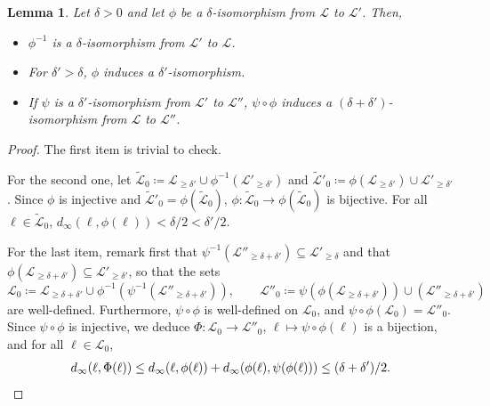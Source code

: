 \documentclass[11pt]{article}
\newtheorem{lemma}[theorem]{Lemma}
\begin{document}
\begin{lemma}
\label{le:tri}
  Let $\delta>0$ and let $\phi$ be a $\delta$-isomorphism from $\mathcal{L}$ to $\mathcal{L}'$. Then,
  \begin{itemize}
  \item $\phi^{-1}$ is a $\delta$-isomorphism from $\mathcal{L}'$ to $\mathcal{L}$.

  \item For  $\delta'>\delta$, $\phi$ induces a $\delta'$-isomorphism.

  \item If $\psi$ is a $\delta'$-isomorphism from $\mathcal{L}'$ to $\mathcal{L}''$, $\psi\circ \phi$ induces a $(\delta+\delta')$-isomorphism from $\mathcal{L}$ to $\mathcal{L}''$.
  \end{itemize}
\end{lemma}
\begin{proof}
  The first item is trivial to check.

  For the second one, let $\tilde{\mathcal{L}}_0\coloneqq \mathcal{L}_{\geq \delta'}\cup \phi^{-1}( \mathcal{L}'_{\geq \delta'}  )$ and $\tilde{\mathcal{L}}'_0\coloneqq \phi(\mathcal{L}_{\geq \delta'})\cup   \mathcal{L}'_{\geq \delta'}  $.
  Since $\phi$ is injective and $\tilde{\mathcal{L}}'_0=\phi(\tilde{\mathcal{L}}_0)$,
  $\phi:\tilde{\mathcal{L}}_0\to\phi(\tilde{\mathcal{L}}_0)$ is bijective. For all $\ell\in \tilde{\mathcal{L}}_0$, $d_\infty(\ell,\phi(\ell))<\delta/2<\delta'/2$.

  For the last item, %
  remark first that $\psi^{-1}(\mathcal{L}''_{\geq \delta+\delta'})\subseteq \mathcal{L}'_{\geq \delta}$ and that $\phi(\mathcal{L}_{\geq \delta+\delta'})\subseteq \mathcal{L}'_{\geq \delta'}$, so that the sets
  \[
  \mathcal{L}_0\coloneqq \mathcal{L}_{\geq \delta+\delta'}\cup \phi^{-1}(\psi^{-1}(\mathcal{L}''_{\geq \delta+\delta'})), \qquad
  \mathcal{L}''_0\coloneqq\psi ( \phi( \mathcal{L}_{\geq \delta+\delta'} ))\cup (\mathcal{L}''_{\geq \delta+\delta'})
  \]
  are well-defined.
  Furthermore, $\psi\circ \phi$ is well-defined on $\mathcal{L}_0$, and $\psi\circ \phi(\mathcal{L}_0)=\mathcal{L}''_0$. Since $\psi\circ \phi$ is injective, we deduce
  $\Phi:\mathcal{L}_0\to  \mathcal{L}''_0$, $\ell\mapsto \psi\circ \phi(\ell)$ is a bijection, and for all $\ell\in \mathcal{L}_0$,
  \[d_\infty(\ell,\Phi(\ell))\leq d_\infty(\ell,\phi(\ell)) +d_\infty(\phi(\ell),\psi(\phi(\ell)))\leq (\delta+\delta')/2 .\qedhere\]
\end{proof}
\end{document}
